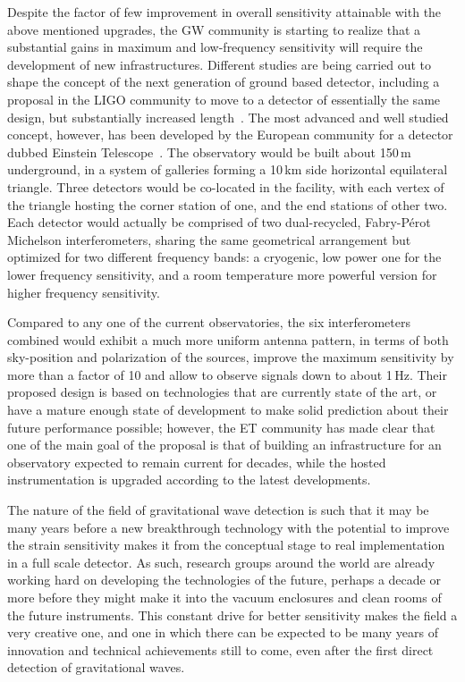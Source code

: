 Despite the factor of few improvement in overall sensitivity attainable with the above mentioned upgrades, the GW community is starting to realize that a substantial gains in maximum and low-frequency sensitivity will require the development of new infrastructures. 
Different studies are being carried out to shape the concept of the next generation of ground based detector, including a proposal in the LIGO community to move to a detector of essentially the same design, but substantially increased length~\cite{Dwyer2015}.
The most advanced and well studied concept, however, has been developed by the European community for a detector dubbed Einstein Telescope~\cite{Punturo2010}.
The observatory would be built about 150\,m underground, in a system of galleries forming a 10\,km side horizontal equilateral triangle. Three detectors would be co-located in the facility, with each vertex of the triangle hosting the corner station of one, and the end stations of other two.
Each detector would actually be comprised of two dual-recycled, Fabry-P\'{e}rot Michelson  interferometers, sharing the same geometrical arrangement but optimized for two different frequency bands: a cryogenic, low power one for the lower frequency sensitivity, and a room temperature more powerful version for higher frequency sensitivity.

Compared to any one of the current observatories, the six interferometers combined would exhibit a much more uniform antenna pattern, in terms of both sky-position and polarization of the sources, improve the maximum sensitivity by more than a factor of 10 and allow to observe signals down to about 1\,Hz. 
Their proposed design is based on technologies that are currently state of the art, or have a mature enough state of development to make solid prediction about their future performance possible; however, the ET community has made clear that one of the main goal of the proposal is that of building an infrastructure for an observatory expected to remain current for decades, while the hosted instrumentation is upgraded according to the latest developments.

The nature of the field of gravitational wave detection is such that it may be many years before a new breakthrough technology with the potential to improve the strain sensitivity makes it from the conceptual stage to real implementation in a full scale detector. 
As such, research groups around the world are already working hard on developing the technologies of the future, perhaps a decade or more before they might make it into the vacuum enclosures and clean rooms of the future instruments. 
This constant drive for better sensitivity makes the field a very creative one, and one in which there can be expected to be many years of innovation and technical achievements still to come, even after the first direct detection of gravitational waves.